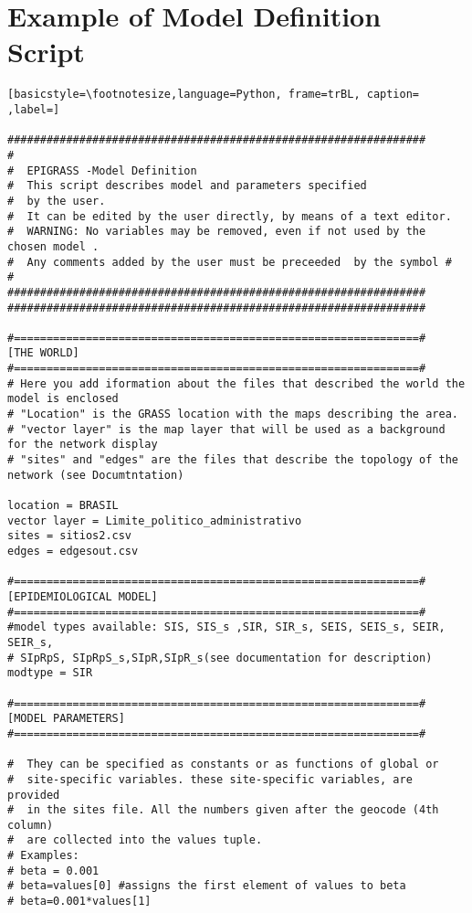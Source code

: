 \chapter{Example of Model Definition Script} 
\label{script}

\begin{lstlisting}[basicstyle=\footnotesize,language=Python, frame=trBL, caption= ,label=]

################################################################
#
#  EPIGRASS -Model Definition
#  This script describes model and parameters specified
#  by the user.
#  It can be edited by the user directly, by means of a text editor.
#  WARNING: No variables may be removed, even if not used by the chosen model . 
#  Any comments added by the user must be preceeded  by the symbol #
#
################################################################
################################################################

#==============================================================#
[THE WORLD]
#==============================================================#
# Here you add iformation about the files that described the world the model is enclosed
# "Location" is the GRASS location with the maps describing the area.
# "vector layer" is the map layer that will be used as a background for the network display
# "sites" and "edges" are the files that describe the topology of the network (see Documtntation)

location = BRASIL
vector layer = Limite_politico_administrativo
sites = sitios2.csv
edges = edgesout.csv

#==============================================================#
[EPIDEMIOLOGICAL MODEL]
#==============================================================#
#model types available: SIS, SIS_s ,SIR, SIR_s, SEIS, SEIS_s, SEIR, SEIR_s, 
# SIpRpS, SIpRpS_s,SIpR,SIpR_s(see documentation for description)
modtype = SIR

#==============================================================#
[MODEL PARAMETERS]
#==============================================================#

#  They can be specified as constants or as functions of global or 
#  site-specific variables. these site-specific variables, are provided
#  in the sites file. All the numbers given after the geocode (4th column)
#  are collected into the values tuple.
# Examples:
# beta = 0.001
# beta=values[0] #assigns the first element of values to beta 
# beta=0.001*values[1]


\end{lstlisting}
